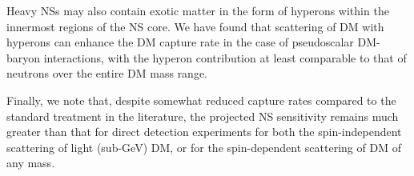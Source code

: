 Heavy NSs may also contain exotic matter in the form of hyperons within the innermost regions of the NS core. We have found that scattering of DM with hyperons can enhance the DM capture rate in the case of pseudoscalar DM-baryon interactions, with the hyperon contribution at least comparable to that of neutrons over the entire DM mass range.

Finally, we note that, despite somewhat reduced capture rates compared to the standard treatment in the literature, the projected NS sensitivity remains much greater than that for direct detection experiments for both the spin-independent scattering of light (sub-GeV) DM, or for the spin-dependent scattering of DM of any mass.  
